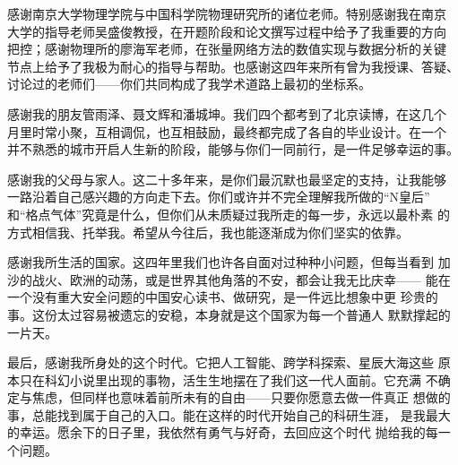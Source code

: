 \begin{acknowledgement}
感谢南京大学物理学院与中国科学院物理研究所的诸位老师。特别感谢我在南京
大学的指导老师吴盛俊教授，在开题阶段和论文撰写过程中给予了我重要的方向
把控；感谢物理所的廖海军老师，在张量网络方法的数值实现与数据分析的关键
节点上给予了我极为耐心的指导与帮助。也感谢这四年来所有曾为我授课、答疑、
讨论过的老师们——你们共同构成了我学术道路上最初的坐标系。

感谢我的朋友管雨泽、聂文辉和潘城坤。我们四个都考到了北京读博，在这几个
月里时常小聚，互相调侃，也互相鼓励，最终都完成了各自的毕业设计。在一个
并不熟悉的城市开启人生新的阶段，能够与你们一同前行，是一件足够幸运的事。

感谢我的父母与家人。这二十多年来，是你们最沉默也最坚定的支持，让我能够
一路沿着自己感兴趣的方向走下去。你们或许并不完全理解我所做的``N皇后''
和``格点气体''究竟是什么，但你们从未质疑过我所走的每一步，永远以最朴素
的方式相信我、托举我。希望从今往后，我也能逐渐成为你们坚实的依靠。

感谢我所生活的国家。这四年里我们也许各自面对过种种小问题，但每当看到
加沙的战火、欧洲的动荡，或是世界其他角落的不安，都会让我无比庆幸——
能在一个没有重大安全问题的中国安心读书、做研究，是一件远比想象中更
珍贵的事。这份太过容易被遗忘的安稳，本身就是这个国家为每一个普通人
默默撑起的一片天。

最后，感谢我所身处的这个时代。它把人工智能、跨学科探索、星辰大海这些
原本只在科幻小说里出现的事物，活生生地摆在了我们这一代人面前。它充满
不确定与焦虑，但同样也意味着前所未有的自由——只要你愿意去做一件真正
想做的事，总能找到属于自己的入口。能在这样的时代开始自己的科研生涯，
是我最大的幸运。愿余下的日子里，我依然有勇气与好奇，去回应这个时代
抛给我的每一个问题。
\end{acknowledgement}
